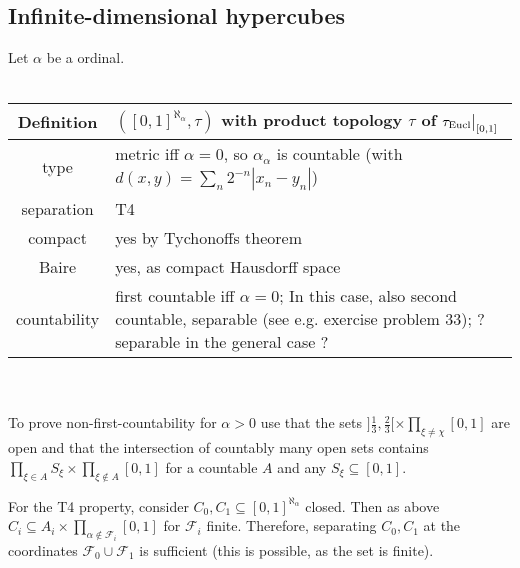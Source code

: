 \documentclass{scrartcl}
\newcommand{\Q}{\mathbb{Q}}
\newcommand\restr[2]{{
    \left.\kern-\nulldelimiterspace
    #1
    \vphantom{\big|}
    \right|_{#2}
}}
\begin{document}
\subsection{Infinite-dimensional hypercubes}
\label{top:hypercube}
Let $\alpha$ be a ordinal.
\\\\
\begin{tabular}{c | p{}}
    Definition & $([0, 1]^{\aleph_\alpha}, \tau)$ with product topology $\tau$ of $\restr{\tau_{\mathrm{Eucl}}}{[0, 1]}$ \\
    \hline
    type & metric iff $\alpha = 0$, so $\alpha_\alpha$ is countable (with $d(x,y) = \sum_n 2^{-n}|x_n - y_n|$) \\
    separation & T4 \\
    compact & yes by Tychonoffs theorem \\
    Baire & yes, as compact Hausdorff space \\
    countability & first countable iff $\alpha = 0$; In this case, also second countable, separable (see e.g. exercise problem 33); ? separable in the general case ?
\end{tabular}
\\\\
To prove non-first-countability for $\alpha > 0$ use that the sets $]\frac 1 3, \frac 2 3[ \times \prod_{\xi \neq \chi} [0, 1]$ are open and that the intersection of countably many open sets contains $\prod_{\xi \in A} S_\xi \times \prod_{\xi \notin A} [0, 1]$ for a countable $A$ and any $S_\xi \subseteq [0, 1]$.

For the T4 property, consider $C_0, C_1 \subseteq [0,1]^{\aleph_\alpha}$ closed. Then as above $C_i \subseteq A_i \times \prod_{\alpha \notin \mathcal{F}_i} [0,1]$ for $\mathcal{F}_i$ finite. Therefore, separating $C_0, C_1$ at the coordinates $\mathcal{F}_0 \cup \mathcal{F}_1$ is sufficient (this is possible, as the set is finite).

\end{document}
